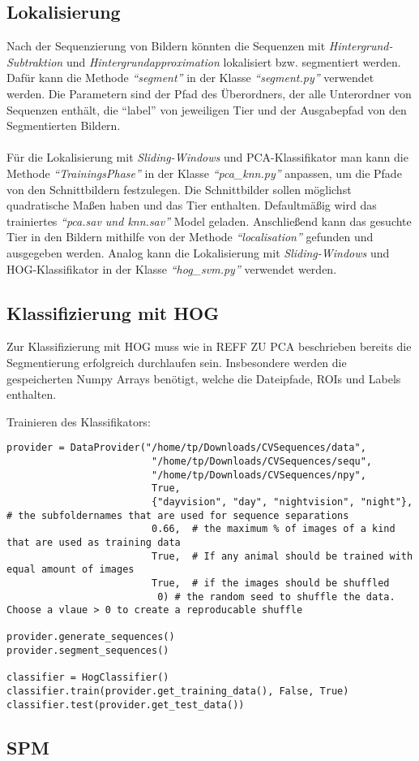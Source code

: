 \subsection*{Lokalisierung}
Nach der Sequenzierung von Bildern könnten die Sequenzen mit \textit{Hintergrund-Subtraktion} und \textit{Hintergrundapproximation} lokalisiert bzw. segmentiert werden. Dafür kann die Methode \textit{``segment''} in der Klasse \textit{``segment.py''} verwendet werden.
Die Parametern sind der Pfad des Überordners, der alle Unterordner von Sequenzen enthält, die ``label'' von jeweiligen Tier und der Ausgabepfad von den Segmentierten Bildern.\\\\
Für die Lokalisierung mit \textit{Sliding-Windows} und PCA-Klassifikator man kann die Methode \textit{``TrainingsPhase''} in der Klasse \textit{``pca\_knn.py''} anpassen, um die Pfade von den Schnittbildern festzulegen. Die Schnittbilder sollen möglichst quadratische Maßen haben und das Tier enthalten. Defaultmäßig wird das trainiertes \textit{``pca.sav und knn.sav''} Model geladen. Anschließend kann das gesuchte Tier in den Bildern mithilfe von der Methode \textit{``localisation''} gefunden und ausgegeben werden. Analog kann die Lokalisierung mit \textit{Sliding-Windows} und HOG-Klassifikator in der Klasse \textit{``hog\_svm.py''} verwendet werden.
\subsection*{Klassifizierung mit HOG}
Zur Klassifizierung mit HOG muss wie in REFF ZU PCA beschrieben bereits die Segmentierung erfolgreich durchlaufen sein. Insbesondere werden die gespeicherten Numpy Arrays benötigt, welche die Dateipfade, ROIs und Labels enthalten.

Trainieren des Klassifikators:


\begin{lstlisting}
provider = DataProvider("/home/tp/Downloads/CVSequences/data",
                         "/home/tp/Downloads/CVSequences/sequ",
                         "/home/tp/Downloads/CVSequences/npy",
                         True,
                         {"dayvision", "day", "nightvision", "night"},  # the subfoldernames that are used for sequence separations
                         0.66,  # the maximum % of images of a kind that are used as training data
                         True,  # If any animal should be trained with equal amount of images
                         True,  # if the images should be shuffled
                          0) # the random seed to shuffle the data. Choose a vlaue > 0 to create a reproducable shuffle

provider.generate_sequences()
provider.segment_sequences()

classifier = HogClassifier()
classifier.train(provider.get_training_data(), False, True)
classifier.test(provider.get_test_data())
\end{lstlisting}



\subsection*{SPM}




